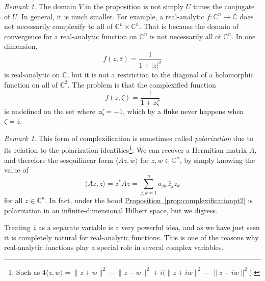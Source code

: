 \documentclass[12pt,openany]{book}
\newcommand{\linnprod}[2]{\langle #1 , #2 \rangle}
\newcommand{\sabs}[1]{\lvert {#1} \rvert}
\newcommand{\snorm}[1]{\lVert {#1} \rVert}
\newcommand{\C}{{\mathbb{C}}}
\newcommand{\myindex}[1]{#1\index{#1}}
\theoremstyle{plain}
\theoremstyle{remark}
\newtheorem{remark}[thm]{Remark}
\theoremstyle{definition}
\theoremstyle{exercise}
\theoremstyle{example}
\newcommand{\propref}[1]{\hyperref[#1]{Proposition~\ref*{#1}}}
\begin{document}
\begin{remark}
The domain $V$ in the proposition is not simply $U$ times the conjugate of $U$.
In general, it is much smaller.  For example, a real-analytic $f \colon \C^n \to
\C$ does not necessarily complexify to all of $\C^n \times \C^n$.
That is
because the domain of convergence for a real-analytic function on $\C^n$
is not necessarily all of $\C^n$.  In one dimension,
\begin{equation*}
f(z,\bar{z})
= \frac{1}{1+\sabs{z}^2}
\end{equation*}
is real-analytic on $\C$, but it is not a restriction to the diagonal
of a holomorphic function on all of $\C^2$.  The problem is that the complexified
function
\begin{equation*}
f(z,\zeta)
= \frac{1}{1+z \zeta}
\end{equation*}
is undefined on the set where $z \zeta = -1$, which by a fluke
never happens when $\zeta = \bar{z}$.
\end{remark}

\begin{remark}
This form of complexification is sometimes called
\emph{\myindex{polarization}} due to its relation to the polarization
identities\footnote{Such as $4 \linnprod{z}{w} =
\snorm{z+w}^2-\snorm{z-w}^2 +i \bigl( \snorm{z+iw}^2 - \snorm{z-iw}^2
\bigr)$.}:  We can recover a Hermitian matrix $A$,
and therefore the sesquilinear form $\linnprod{Az}{w}$ for
$z,w\in \C^n$, by simply knowing the value of
\begin{equation*}
\linnprod{Az}{z} = z^*Az = \sum_{j,k=1}^n a_{jk} \, \bar{z}_j z_k 
\end{equation*}
for all $z \in \C^n$.  In fact, under the hood \propref{prop:complexificationpt2} is
polarization in an infinite-dimensional Hilbert space, but we digress.
\end{remark}

Treating $\bar{z}$ as a separate variable is a very powerful idea, and
as we have just seen it is completely natural for
real-analytic functions.  This is one of the reasons why real-analytic
functions play a special role in several complex variables.
\end{document}
